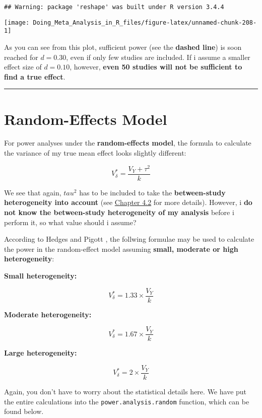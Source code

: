 \documentclass[]{book}
\theoremstyle{definition}
\theoremstyle{definition}
\theoremstyle{definition}
\theoremstyle{remark}
\begin{document}
\begin{verbatim}
## Warning: package 'reshape' was built under R version 3.4.4
\end{verbatim}

\begin{center}\texttt{[image: Doing\_Meta\_Analysis\_in\_R\_files/figure-latex/unnamed-chunk-208-1]} \end{center}

As you can see from this plot, sufficient power (see the \textbf{dashed
line}) is soon reached for \(d=0.30\), even if only few studies are
included. If i assume a smaller effect size of \(d=0.10\), however,
\textbf{even 50 studies will not be sufficient to find a true effect}.

\begin{center}\rule{0.5\linewidth}{\linethickness}\end{center}

\section{Random-Effects Model}\label{random-effects-model}

For power analyses under the \textbf{random-effects model}, the formula
to calculate the variance of my true mean effect looks slightly
different:

\[V_{\delta}^*=\frac{V_Y+\tau^2}{k}\]

We see that again, \(tau^2\) has to be included to take the
\textbf{between-study heterogeneity into account} (see
\protect\hyperlink{random}{Chapter 4.2} for more details). However, i
\textbf{do not know the between-study heterogeneity of my analysis}
before i perform it, so what value should i assume?

According to Hedges and Pigott \citep{hedges2004power}, the follwing
formulae may be used to calculate the power in the random-effect model
assuming \textbf{small, moderate or high heterogeneity}:

\textbf{Small heterogeneity:}

\[V_{\delta}^*=1.33\times\frac{V_Y}{k}\]

\textbf{Moderate heterogeneity:}

\[V_{\delta}^*=1.67\times\frac{V_Y}{k}\]

\textbf{Large heterogeneity:}

\[V_{\delta}^*=2\times\frac{V_Y}{k}\]

Again, you don't have to worry about the statistical details here. We
have put the entire calculations into the \texttt{power.analysis.random}
function, which can be found below.
\end{document}
